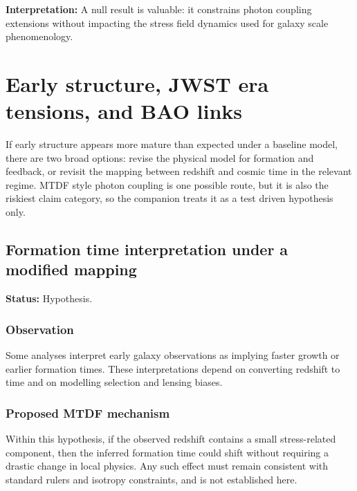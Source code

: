 \documentclass[11pt,a4paper]{article}
\begin{document}
\begin{mdframed}[linecolor=accent,linewidth=0.5pt,backgroundcolor=callout-bg,leftline=true,rightline=true,topline=true,bottomline=true,innerleftmargin=8pt,innerrightmargin=8pt,innertopmargin=6pt,innerbottommargin=6pt]
\textbf{Interpretation:} A null result is valuable: it constrains photon coupling extensions without impacting the stress field dynamics used for galaxy scale phenomenology.
\end{mdframed}

\section{Early structure, JWST era tensions, and BAO links}
\label{sec:early}
If early structure appears more mature than expected under a baseline model, there are two broad options: revise the physical model for formation and feedback, or revisit the mapping between redshift and cosmic time in the relevant regime.
MTDF style photon coupling is one possible route, but it is also the riskiest claim category, so the companion treats it as a test driven hypothesis only.

\subsection{Formation time interpretation under a modified mapping}
\begin{mdframed}[linecolor=accent,linewidth=0.5pt,backgroundcolor=callout-bg,leftline=true,rightline=true,topline=true,bottomline=true,innerleftmargin=8pt,innerrightmargin=8pt,innertopmargin=6pt,innerbottommargin=6pt]
\textbf{Status:} Hypothesis.
\end{mdframed}

\subsubsection{Observation}
Some analyses interpret early galaxy observations as implying faster growth or earlier formation times. These interpretations depend on converting redshift to time and on modelling selection and lensing biases.

\subsubsection{Proposed MTDF mechanism}
Within this hypothesis, if the observed redshift contains a small stress-related component, then the inferred formation time could shift without requiring a drastic change in local physics. Any such effect must remain consistent with standard rulers and isotropy constraints, and is not established here.
\end{document}
